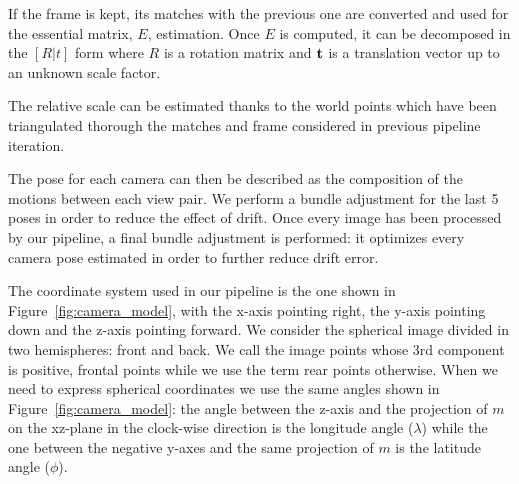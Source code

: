 If the frame is kept, its matches with the previous one are converted
and used for the essential matrix, $E$, estimation. Once $E$ is computed, 
it can be decomposed in the \([R|t]\) form where $R$ is a rotation matrix 
and $\mathbf{t}$ is a translation vector up to an unknown scale factor.

The relative scale can be estimated thanks to the world points which have been 
triangulated thorough the matches and frame considered in previous pipeline 
iteration.

The pose for each camera can then be described as the composition of the 
motions between each view pair. We perform a bundle adjustment for the last 5 
poses in order to reduce the effect of drift.
Once every image has been processed by our pipeline, a final 
bundle adjustment is performed: it optimizes every camera pose estimated in order to 
further reduce drift error.

The coordinate system used in our pipeline is the one shown in 
Figure~\ref{fig:camera_model}, with the x-axis pointing right, the y-axis 
pointing down and the z-axis pointing forward.
We consider the spherical image divided in two hemispheres: front and back.
We call the image points 
whose 3rd component is positive, frontal points while we use the term rear 
points otherwise.
When we need to express spherical coordinates we use the same angles shown in 
Figure~\ref{fig:camera_model}:
the angle between the z-axis and the projection of $m$ on the xz-plane in 
the clock-wise direction is the longitude angle ($\lambda$) while the one 
between the negative y-axes and the same projection of $m$ is the latitude 
angle ($\phi$).

